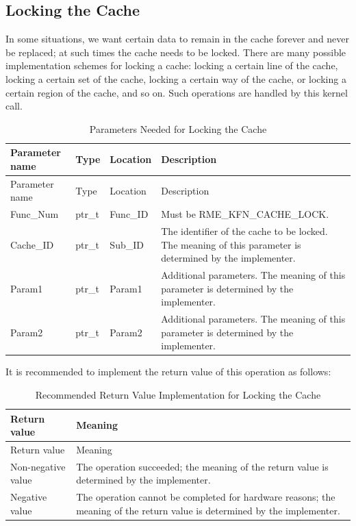 \subsection{Locking the Cache}\label{subsec:8-lock-cache}

In some situations, we want certain data to remain in the cache forever and never be replaced; at such times the cache needs to be locked. There are many possible implementation schemes for locking a cache: locking a certain line of the cache, locking a certain set of the cache, locking a certain way of the cache, or locking a certain region of the cache, and so on. Such operations are handled by this kernel call.

\begin{xltabular}{\textwidth}{@{}>{\hsize\raggedright\arraybackslash}X>{\hsize\raggedright\arraybackslash}X>{\hsize\raggedright\arraybackslash}X>{\hsize\raggedright\arraybackslash}X@{}}
\caption{Parameters Needed for Locking the Cache}\label{tab:8-31-lock-cache-parameters}\\
\toprule
Parameter name & Type & Location & Description\tabularnewline
\endfirsthead
\toprule
Parameter name & Type & Location & Description\tabularnewline
\midrule
\endhead
\bottomrule
\endlastfoot
Func\_Num & ptr\_t & Func\_ID & Must be RME\_KFN\_CACHE\_LOCK.\tabularnewline
Cache\_ID & ptr\_t & Sub\_ID &
The identifier of the cache to be locked. The meaning of this parameter is determined by the implementer.\tabularnewline
Param1 & ptr\_t & Param1 &
Additional parameters. The meaning of this parameter is determined by the implementer.\tabularnewline
Param2 & ptr\_t & Param2 &
Additional parameters. The meaning of this parameter is determined by the implementer.\tabularnewline
\end{xltabular}
\nopagebreak[4]

It is recommended to implement the return value of this operation as follows:

\begin{xltabular}{\textwidth}{@{}>{\hsize\raggedright\arraybackslash}X>{\hsize\raggedright\arraybackslash}X@{}}
\caption{Recommended Return Value Implementation for Locking the Cache}\label{tab:8-32-lock-cache-suggested-return-values}\\
\toprule
Return value & Meaning\tabularnewline
\endfirsthead
\toprule
Return value & Meaning\tabularnewline
\midrule
\endhead
\bottomrule
\endlastfoot
    Non-negative value & The operation succeeded; the meaning of the return value is determined by the implementer.\tabularnewline
    Negative value & The operation cannot be completed for hardware reasons; the meaning of the return value is determined by the implementer.\tabularnewline
\end{xltabular}
\nopagebreak[4]

